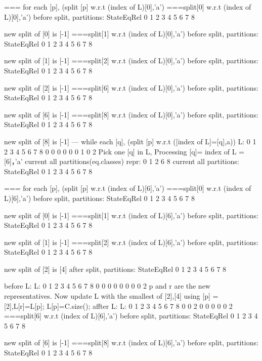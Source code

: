 === for each [p], (split [p] w.r.t (index of L)[0],'a')
===split[0] w.r.t (index of L)[0],'a')
before split, partitions:
StateEqRel
{ 0 }
{ 1 }
{ 2  3  4  5 }
{ 6  7 }
{ 8 }

new split of [0] is [-1]
===split[1] w.r.t (index of L)[0],'a')
before split, partitions:
StateEqRel
{ 0 }
{ 1 }
{ 2  3  4  5 }
{ 6  7 }
{ 8 }

new split of [1] is [-1]
===split[2] w.r.t (index of L)[0],'a')
before split, partitions:
StateEqRel
{ 0 }
{ 1 }
{ 2  3  4  5 }
{ 6  7 }
{ 8 }

new split of [2] is [-1]
===split[6] w.r.t (index of L)[0],'a')
before split, partitions:
StateEqRel
{ 0 }
{ 1 }
{ 2  3  4  5 }
{ 6  7 }
{ 8 }

new split of [6] is [-1]
===split[8] w.r.t (index of L)[0],'a')
before split, partitions:
StateEqRel
{ 0 }
{ 1 }
{ 2  3  4  5 }
{ 6  7 }
{ 8 }

new split of [8] is [-1]
--- while each [q], (split [p] w.r.t ([index of L]=[q],a))
L:
0 1 2 3 4 5 6 7 8
0 0 0 0 0 0 1 0 2
Pick one [q] in L, Processing [q]= index of L = [6]，'a'
current all partitions(eq.classes) repr:
{ 0  1  2  6  8 }
current all partitions:
StateEqRel
{ 0 }
{ 1 }
{ 2  3  4  5 }
{ 6  7 }
{ 8 }

=== for each [p], (split [p] w.r.t (index of L)[6],'a')
===split[0] w.r.t (index of L)[6],'a')
before split, partitions:
StateEqRel
{ 0 }
{ 1 }
{ 2  3  4  5 }
{ 6  7 }
{ 8 }

new split of [0] is [-1]
===split[1] w.r.t (index of L)[6],'a')
before split, partitions:
StateEqRel
{ 0 }
{ 1 }
{ 2  3  4  5 }
{ 6  7 }
{ 8 }

new split of [1] is [-1]
===split[2] w.r.t (index of L)[6],'a')
before split, partitions:
StateEqRel
{ 0 }
{ 1 }
{ 2  3  4  5 }
{ 6  7 }
{ 8 }

new split of [2] is [4]
after split, partitions:
StateEqRel
{ 0 }
{ 1 }
{ 2  3 }
{ 4  5 }
{ 6  7 }
{ 8 }

before L:
L:
0 1 2 3 4 5 6 7 8
0 0 0 0 0 0 0 0 2
p and r are the new representatives. Now update L with the smallest of [2],[4]
using [p] = [2],L[r]=L[p]; L[p]=C.size();
affter L:
L:
0 1 2 3 4 5 6 7 8
0 0 2 0 0 0 0 0 2
===split[6] w.r.t (index of L)[6],'a')
before split, partitions:
StateEqRel
{ 0 }
{ 1 }
{ 2  3 }
{ 4  5 }
{ 6  7 }
{ 8 }

new split of [6] is [-1]
===split[8] w.r.t (index of L)[6],'a')
before split, partitions:
StateEqRel
{ 0 }
{ 1 }
{ 2  3 }
{ 4  5 }
{ 6  7 }
{ 8 }

